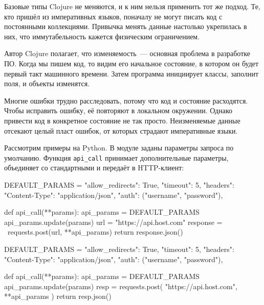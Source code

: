 Базовые типы Clojure не меняются, и к ним нельзя применить тот же подход. Те,
кто пришёл из императивных языков, поначалу не могут писать код с постоянными
коллекциями. Привычка менять данные настолько укрепилась в них, что
иммутабельность кажется физическим ограничением.

Автор Clojure полагает, что изменяемость~--- основная проблема в разработке
ПО. Когда мы пишем код, то видим его начальное состояние, в котором он будет
первый такт машинного времени. Затем программа инициирует классы, заполнит поля,
и объекты изменятся.

Многие ошибки трудно расследовать, потому что код и состояние расходятся. Чтобы
исправить ошибку, её повторяют в локальном окружении. Однако привести код в
конкретное состояние не так просто. Неизменяемые данные отсекают целый пласт
ошибок, от которых страдают императивные языки.


Рассмотрим примеры на Python. В модуле заданы параметры запроса по
умолчанию. Функция \verb|api_call| принимает дополнительные параметры,
объединяет со стандартными и передаёт в HTTP-клиент:

\ifnarrow

\begin{english}
  \begin{python/lines}
DEFAULT_PARAMS = {
    "allow_redirects": True,
    "timeout": 5,
    "headers": {"Content-Type":
                "application/json"},
    "auth": ("username", "password"),
}

def api_call(**params):
    api_params = DEFAULT_PARAMS
    api_params.update(params)
    url = "https://api.host.com"
    response = \
      requests.post(url, **api_params)
    return response.json()
  \end{python/lines}
\end{english}

\else

\begin{english}
  \begin{python/lines}
DEFAULT_PARAMS = {
    "allow_redirects": True,
    "timeout": 5,
    "headers": {"Content-Type": "application/json"},
    "auth": ("username", "password"),
}

def api_call(**params):
    api_params = DEFAULT_PARAMS
    api_params.update(params)
    resp = requests.post(
        "https://api.host.com", **api_params
    )
    return resp.json()
  \end{python/lines}
\end{english}

